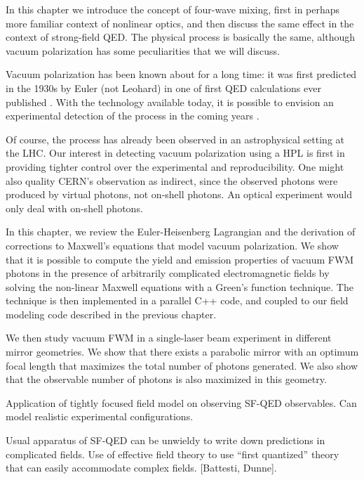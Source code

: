 \documentclass[11pt,SymmetricalJury]{inrsthesis/inrsthesis}
\begin{document}
In this chapter we introduce the concept of four-wave mixing, first in perhaps
more familiar context of nonlinear optics, and then discuss the same effect in
the context of strong-field QED. The physical process is basically the same,
although vacuum polarization has some peculiarities that we will discuss.

Vacuum polarization has been known about for a long time: it was first predicted
in the 1930s by Euler (not Leohard) in one of first QED calculations ever
published \cite{}. With the technology available today, it is possible to
envision an experimental detection of the process in the coming years \cite{}.

Of course, the process has already been observed in an astrophysical setting
\cite{} at the LHC. Our interest in detecting vacuum polarization using a HPL is
first in providing tighter control over the experimental and reproducibility.
One might also quality CERN's observation as indirect, since the observed
photons were produced by virtual photons, not on-shell photons. An optical
experiment would only deal with on-shell photons.

In this chapter, we review the Euler-Heisenberg Lagrangian and the derivation of
corrections to Maxwell's equations that model vacuum polarization. We show that
it is possible to compute the yield and emission properties of vacuum FWM
photons in the presence of arbitrarily complicated electromagnetic fields by
solving the non-linear Maxwell equations with a Green's function technique. The
technique is then implemented in a parallel C++ code, and coupled to our field
modeling code described in the previous chapter.

We then study vacuum FWM in a single-laser beam experiment in different mirror
geometries. We show that there exists a parabolic mirror with an optimum focal
length that maximizes the total number of photons generated. We also show that
the observable number of photons is also maximized in this geometry.

Application of tightly focused field model on observing SF-QED observables. Can
model realistic experimental configurations.


Usual apparatus of SF-QED can be unwieldy to write down predictions in
complicated fields. Use of effective field theory to use ``first quantized''
theory that can easily accommodate complex fields. [Battesti, Dunne].
\end{document}
